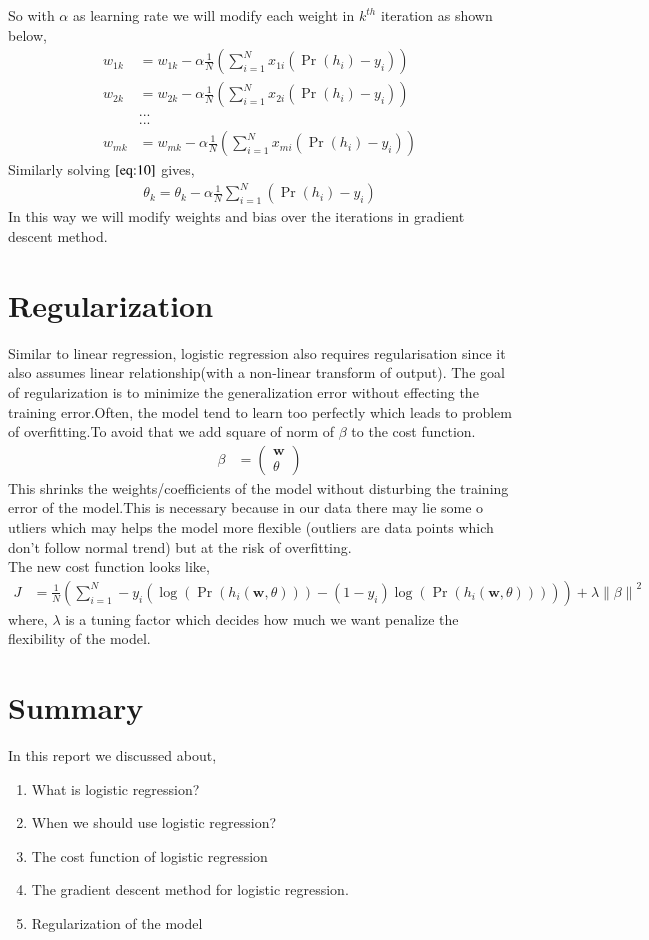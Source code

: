 \documentclass[journal,12pt,onecolumn]{IEEEtran}
\providecommand{\pr}[1]{\ensuremath{\Pr\left(#1\right)}}
\providecommand{\brak}[1]{\ensuremath{\left(#1\right)}}
\theoremstyle{remark}
\providecommand{\norm}[1]{\left\lVert#1\right\rVert}
\newcommand{\myvec}[1]{\ensuremath{\begin{pmatrix}#1\end{pmatrix}}}
\numberwithin{equation}{section}
\let\vec\mathbf
\begin{document}
		So with $\alpha$ as learning rate we will modify each weight in $k^{th}$ iteration as shown below,
		\begin{align}
			w_{1k} &= w_{1k} - \alpha\frac{1}{N}\brak{\sum_{i=1}^{N}x_{1i}\brak{\pr{h_i}-y_i}}\\
			w_{2k} &= w_{2k} - \alpha\frac{1}{N}\brak{\sum_{i=1}^{N}x_{2i}\brak{\pr{h_i}-y_i}}\\
			& ...\nonumber \\
			& ...\nonumber\\
			w_{mk} &= w_{mk} - \alpha\frac{1}{N}\brak{\sum_{i=1}^{N}x_{mi}\brak{\pr{h_i}-y_i}}
		\end{align}
		Similarly solving $\eqref{eq:10}$ gives,
		\begin{align}
			\theta_k = \theta_k - \alpha\frac{1}{N}\sum_{i=1}^{N}\brak{\pr{h_i} - y_i}
		\end{align}
		In this way we will modify weights and bias over the iterations in gradient descent method.
		\section{Regularization}
		Similar to linear regression, logistic regression also requires regularisation since it also assumes linear relationship(with a non-linear transform of output).
		The goal of regularization is to minimize the generalization error without effecting the training error.Often, the model tend to learn too perfectly which leads
		to problem of overfitting.To avoid that we add square of norm of $\beta$ to the cost function.
		\begin{align}
			\beta &= \myvec{\vec{w}\\\theta}
		\end{align}
		This shrinks the weights/coefficients of the model without disturbing the training error of the model.This is necessary because in our data there may lie some o
		utliers which may helps the model more flexible (outliers are data points which don't follow normal trend) but at the risk of overfitting.\\
		The new cost function looks like,
		\begin{align}
			J &= \frac{1}{N}\brak{\sum_{i=1}^{N}-y_{i}\brak{\log\brak{\pr{h_i\brak{\vec{w},\theta}}} - \brak{1-y_i}\log\brak{\pr{h_i\brak{\vec{w},\theta}}}}} +
			\lambda\norm{\beta}^2
		\end{align}
		where, $\lambda$ is a tuning factor which decides how much we want penalize the flexibility of the model.
		\section{Summary}
		In this report we discussed about,
		\begin{enumerate}
			\item What is logistic regression?
			\item When we should use logistic regression?
			\item The cost function of logistic regression
			\item The gradient descent method for logistic regression.
			\item Regularization of the model
		\end{enumerate}
\end{document}
